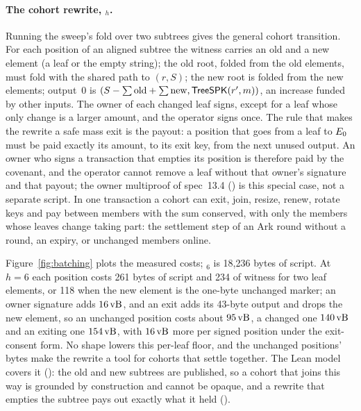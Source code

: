\paragraph{The cohort rewrite, $_h$.} Running the sweep's
fold over two subtrees gives the general cohort transition. For each
position of an aligned subtree the witness carries an old and a new
element (a leaf or the empty string); the old root, folded from the old
elements, must fold with the shared path to $(r, S)$; the new root is
folded from the new elements; output~0 is
$(S - \sum\mathrm{old} + \sum\mathrm{new}, \mathsf{TreeSPK}(r', m))$, an increase
funded by other inputs. The owner of each changed leaf signs, except for
a leaf whose only change is a larger amount, and the operator signs once.
The rule that makes the rewrite a safe mass exit is the payout: a
position that goes from a leaf to $E_0$ must be paid exactly its
amount, to its exit key, from the next unused output. An owner who signs
a transaction that empties its position is therefore paid by the
covenant, and the operator cannot remove a leaf without that owner's
signature and that payout; the owner multiproof of spec~13.4 () is this
special case, not a separate script. In one transaction a cohort can
exit, join, resize, renew, rotate keys and pay between members with the
sum conserved, with only the members whose leaves change taking part:
the settlement step of an Ark round without a round, an expiry, or
unchanged members online.

Figure~\ref{fig:batching} plots the measured costs; $_6$
is 18{,}236 bytes of script. At $h = 6$ each position costs 261 bytes of script and 234 of
witness for two leaf elements, or 118 when the new element is the one-byte
unchanged marker; an owner signature adds $16\,\mathrm{vB}$, and an
exit adds its 43-byte output and drops the new element, so an unchanged
position costs about $95\,\mathrm{vB}$, a changed one $140\,\mathrm{vB}$ and an exiting one
$154\,\mathrm{vB}$, with $16\,\mathrm{vB}$ more per signed position under the exit-consent
form. No shape lowers this per-leaf floor, and the unchanged positions'
bytes make the rewrite a tool for cohorts that settle together. The Lean model covers it (): the old and new subtrees
are published, so a cohort that joins this way is grounded by
construction and cannot be opaque, and a rewrite that empties the
subtree pays out exactly what it held
().


